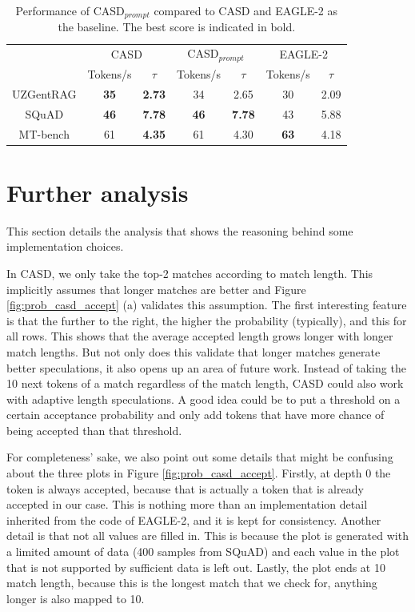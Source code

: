 \begin{table}[h]
  \centering
  \begin{tabular}{ccc|cc|cc}
      & \multicolumn{2}{c}{CASD} & \multicolumn{2}{c}{CASD$_{prompt}$} & \multicolumn{2}{c}{EAGLE-2} \\
      \cline{2-7}
      & Tokens/s & $\tau$ & Tokens/s & $\tau$ & Tokens/s & $\tau$ \\
      \hline
      UZGentRAG & \textbf{35} & \textbf{2.73} & 34 & 2.65 & 30 & 2.09 \\
      SQuAD     & \textbf{46} & \textbf{7.78} & \textbf{46} & \textbf{7.78} & 43 & 5.88 \\
      MT-bench  & 61 & \textbf{4.35} & 61 & 4.30 & \textbf{63} & 4.18 \\
      \hline
  \end{tabular}
  \caption{Performance of CASD$_{prompt}$ compared to CASD and EAGLE-2 as the baseline. The best score is indicated in bold.}
  \label{tab:ablation_benchmarks}
\end{table}

\section{Further analysis}
\label{sec:further_analysis}
This section details the analysis that shows the reasoning behind some implementation choices.

In CASD, we only take the top-2 matches according to match length. This implicitly assumes that longer matches are better and Figure \ref{fig:prob_casd_accept} (a) validates this assumption. The first interesting feature is that the further to the right, the higher the probability (typically), and this for all rows. This shows that the average accepted length grows longer with longer match lengths. But not only does this validate that longer matches generate better speculations, it also opens up an area of future work. Instead of taking the 10 next tokens of a match regardless of the match length, CASD could also work with adaptive length speculations. A good idea could be to put a threshold on a certain acceptance probability and only add tokens that have more chance of being accepted than that threshold. 

For completeness' sake, we also point out some details that might be confusing about the three plots in Figure \ref{fig:prob_casd_accept}. Firstly, at depth 0 the token is always accepted, because that is actually a token that is already accepted in our case. This is nothing more than an implementation detail inherited from the code of EAGLE-2, and it is kept for consistency. Another detail is that not all values are filled in. This is because the plot is generated with a limited amount of data (400 samples from SQuAD) and each value in the plot that is not supported by sufficient data is left out. Lastly, the plot ends at 10 match length, because this is the longest match that we check for, anything longer is also mapped to 10. 

